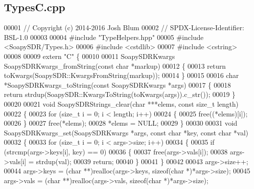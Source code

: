 \subsection{Types\+C.\+cpp}
\label{TypesC_8cpp_source}

\begin{DoxyCode}
00001 \textcolor{comment}{// Copyright (c) 2014-2016 Josh Blum}
00002 \textcolor{comment}{// SPDX-License-Identifier: BSL-1.0}
00003 
00004 \textcolor{preprocessor}{#include "TypeHelpers.hpp"}
00005 \textcolor{preprocessor}{#include <SoapySDR/Types.h>}
00006 \textcolor{preprocessor}{#include <cstdlib>}
00007 \textcolor{preprocessor}{#include <cstring>}
00008 
00009 \textcolor{keyword}{extern} \textcolor{stringliteral}{"C"} \{
00010 
00011 SoapySDRKwargs SoapySDRKwargs_fromString(\textcolor{keyword}{const} \textcolor{keywordtype}{char} *markup)
00012 \{
00013     \textcolor{keywordflow}{return} toKwargs(SoapySDR::KwargsFromString(markup));
00014 \}
00015 
00016 \textcolor{keywordtype}{char} *SoapySDRKwargs_toString(\textcolor{keyword}{const} SoapySDRKwargs *args)
00017 \{
00018     \textcolor{keywordflow}{return} strdup(SoapySDR::KwargsToString(toKwargs(args)).c\_str());
00019 \}
00020 
00021 \textcolor{keywordtype}{void} SoapySDRStrings_clear(\textcolor{keywordtype}{char} ***elems, \textcolor{keyword}{const} \textcolor{keywordtype}{size\_t} length)
00022 \{
00023     \textcolor{keywordflow}{for} (\textcolor{keywordtype}{size\_t} i = 0; i < length; i++)
00024     \{
00025         free((*elems)[i]);
00026     \}
00027     free(*elems);
00028     *elems = NULL;
00029 \}
00030 
00031 \textcolor{keywordtype}{void} SoapySDRKwargs_set(SoapySDRKwargs *args, \textcolor{keyword}{const} \textcolor{keywordtype}{char} *key, \textcolor{keyword}{const} \textcolor{keywordtype}{char} *val)
00032 \{
00033     \textcolor{keywordflow}{for} (\textcolor{keywordtype}{size\_t} i = 0; i < args->size; i++)
00034     \{
00035         \textcolor{keywordflow}{if} (strcmp(args->keys[i], key) == 0)
00036         \{
00037             free(args->vals[i]);
00038             args->vals[i] = strdup(val);
00039             \textcolor{keywordflow}{return};
00040         \}
00041     \}
00042 
00043     args->size++;
00044     args->keys = (\textcolor{keywordtype}{char} **)realloc(args->keys, \textcolor{keyword}{sizeof}(\textcolor{keywordtype}{char} *)*args->size);
00045     args->vals = (\textcolor{keywordtype}{char} **)realloc(args->vals, \textcolor{keyword}{sizeof}(\textcolor{keywordtype}{char} *)*args->size);

\end{DoxyCode}
